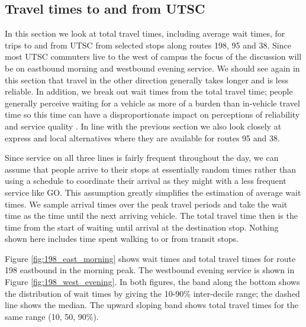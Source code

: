 \documentclass{article}
\begin{document}
	\subsection{Travel times to and from UTSC}\label{sec:travel_times}
		In this section we look at total travel times, including average wait times, for trips to and from UTSC from selected stops along routes 198, 95 and 38. Since most UTSC commuters live to the west of campus the focus of the discussion will be on eastbound morning and westbound evening service. We should see again in this section that travel in the other direction generally takes longer and is less reliable. 
		In addition, we break out wait times from the total travel time; people generally perceive waiting for a vehicle as more of a burden than in-vehicle travel time \parencite[see e.g.][]{Mishalani2006} so this time can have a disproportionate impact on perceptions of reliability and service quality \parencite{Watkins2011}.
		In line with the previous section we also look closely at express and local alternatives where they are available for routes 95 and 38.
		
		Since service on all three lines is fairly frequent throughout the day, we can assume that people arrive to their stops at essentially random times rather than using a schedule to coordinate their arrival as they might with a less frequent service like GO.
		This assumption greatly simplifies the estimation of average wait times. We sample arrival times over the peak travel periods and take the wait time as the time until the next arriving vehicle. The total travel time then is the time from the start of waiting until arrival at the destination stop. Nothing shown here includes time spent walking to or from transit stops. 
		
		Figure \ref{fig:198_east_morning} shows wait times and total travel times for route 198 eastbound in the morning peak. The westbound evening service is shown in Figure \ref{fig:198_west_evening}. 
		In both figures, the band along the bottom shows the distribution of wait times by giving the 10-90\% inter-decile range; the dashed line shows the median. 
		The upward sloping band shows total travel times for the same range (10, 50, 90\%). 
		
\end{document}
